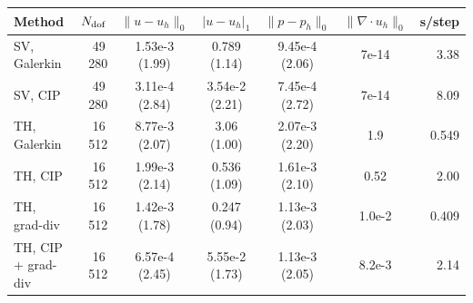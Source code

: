 \begin{tabular}{lrccccr}
\toprule
Method & $N_{\rm dof}$ & $\|u-u_h\|_0$ & $|u-u_h|_1$ & $\|p-p_h\|_0$ & $\|\nabla\cdot u_h\|_0$ & s/step \\
\midrule
SV, Galerkin & 49\,280 & 1.53e-3 (1.99) & 0.789 (1.14) & 9.45e-4 (2.06) & 7e-14 & 3.38 \\
SV, CIP & 49\,280 & 3.11e-4 (2.84) & 3.54e-2 (2.21) & 7.45e-4 (2.72) & 7e-14 & 8.09 \\
TH, Galerkin & 16\,512 & 8.77e-3 (2.07) & 3.06 (1.00) & 2.07e-3 (2.20) & 1.9 & 0.549 \\
TH, CIP & 16\,512 & 1.99e-3 (2.14) & 0.536 (1.09) & 1.61e-3 (2.10) & 0.52 & 2.00 \\
TH, grad-div & 16\,512 & 1.42e-3 (1.78) & 0.247 (0.94) & 1.13e-3 (2.03) & 1.0e-2 & 0.409 \\
TH, CIP + grad-div & 16\,512 & 6.57e-4 (2.45) & 5.55e-2 (1.73) & 1.13e-3 (2.05) & 8.2e-3 & 2.14 \\
\bottomrule
\end{tabular}
